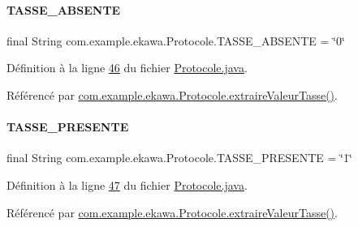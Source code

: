 \paragraph{\texorpdfstring{T\+A\+S\+S\+E\+\_\+\+A\+B\+S\+E\+N\+TE}{TASSE\_ABSENTE}}
{\footnotesize\ttfamily final String com.\+example.\+ekawa.\+Protocole.\+T\+A\+S\+S\+E\+\_\+\+A\+B\+S\+E\+N\+TE = \char`\"{}0\char`\"{}\hspace{0.3cm}{\ttfamily [static]}}



Définition à la ligne \hyperlink{_protocole_8java_source_l00046}{46} du fichier \hyperlink{_protocole_8java_source}{Protocole.\+java}.



Référencé par \hyperlink{_protocole_8java_source_l00255}{com.\+example.\+ekawa.\+Protocole.\+extraire\+Valeur\+Tasse()}.

\mbox{\label{classcom_1_1example_1_1ekawa_1_1_protocole_a2f969365d74ec301bc9d76fb992ed9e6}} 
\paragraph{\texorpdfstring{T\+A\+S\+S\+E\+\_\+\+P\+R\+E\+S\+E\+N\+TE}{TASSE\_PRESENTE}}
{\footnotesize\ttfamily final String com.\+example.\+ekawa.\+Protocole.\+T\+A\+S\+S\+E\+\_\+\+P\+R\+E\+S\+E\+N\+TE = \char`\"{}1\char`\"{}\hspace{0.3cm}{\ttfamily [static]}}



Définition à la ligne \hyperlink{_protocole_8java_source_l00047}{47} du fichier \hyperlink{_protocole_8java_source}{Protocole.\+java}.



Référencé par \hyperlink{_protocole_8java_source_l00255}{com.\+example.\+ekawa.\+Protocole.\+extraire\+Valeur\+Tasse()}.

\mbox{\label{classcom_1_1example_1_1ekawa_1_1_protocole_a710b865b4ce664d2adda2f5d5ccd6a72}} 
